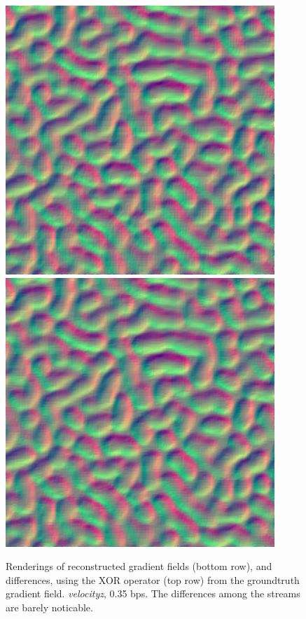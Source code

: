 \begin{figure}[h]
{	{\includegraphics[width=0.23\linewidth]{img/gradient/gradient_2.png}}
	{\includegraphics[width=0.23\linewidth]{img/gradient/gradient_3.png}}}
	\caption{Renderings of reconstructed gradient fields (bottom row), and differences, using the XOR
	operator (top row) from the groundtruth gradient field. \emph{velocityz}, 0.35 bps. The
	differences among the streams are barely noticable.}
  \label{fig:gradient-rendering-diff}
\end{figure}


